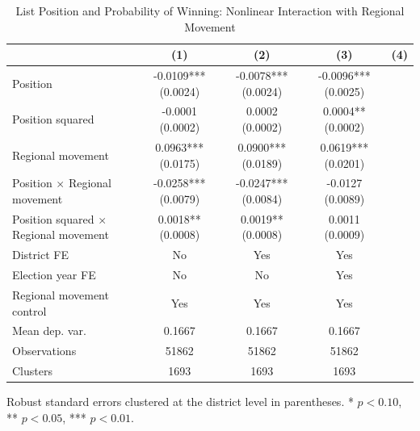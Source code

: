 \begin{table}[htbp]
\centering
\caption{List Position and Probability of Winning: Nonlinear Interaction with Regional Movement}
\label{tab:nonlinear_interaction_specs}
\begin{tabular}{lccc}
\toprule
 & (1) & (2) & (3) & (4) \\
\midrule
Position & -0.0109*** (0.0024) & -0.0078*** (0.0024) & -0.0096*** (0.0025) \\
Position squared & -0.0001 (0.0002) & 0.0002 (0.0002) & 0.0004** (0.0002) \\
Regional movement & 0.0963*** (0.0175) & 0.0900*** (0.0189) & 0.0619*** (0.0201) \\
Position $\times$ Regional movement & -0.0258*** (0.0079) & -0.0247*** (0.0084) & -0.0127 (0.0089) \\
Position squared $\times$ Regional movement & 0.0018** (0.0008) & 0.0019** (0.0008) & 0.0011 (0.0009) \\
\midrule
District FE & No & Yes & Yes \\
Election year FE & No & No & Yes \\
Regional movement control & Yes & Yes & Yes \\
Mean dep. var. & 0.1667 & 0.1667 & 0.1667 \\
Observations & 51862 & 51862 & 51862 \\
Clusters & 1693 & 1693 & 1693 \\
\bottomrule
\end{tabular}
\begin{flushleft}
\footnotesize Robust standard errors clustered at the district level in parentheses. * $p<0.10$, ** $p<0.05$, *** $p<0.01$.
\end{flushleft}
\end{table}